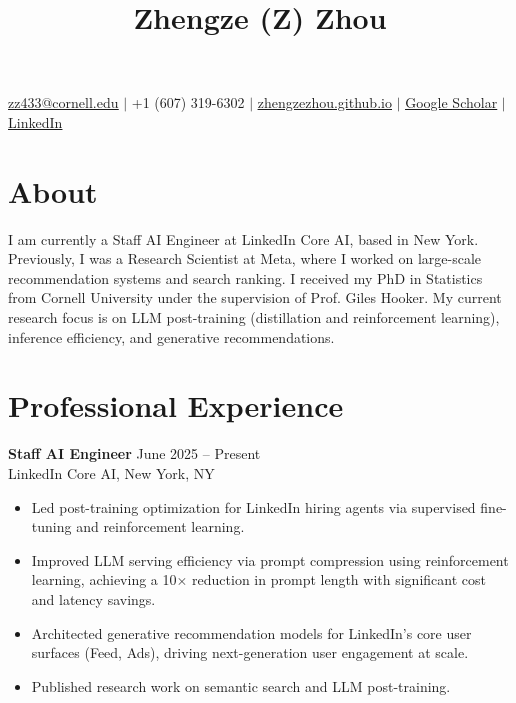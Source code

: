 \documentclass{article}
\title{\textbf{Zhengze (Z) Zhou}\vspace{-3em}}
\author{}
\date{}
\begin{document}
\pagestyle{empty}
\maketitle

\begin{center}
  \small
  \href{mailto:zz433@cornell.edu}{\underline{zz433@cornell.edu}}
  $|$ +1 (607) 319-6302
  $|$ \href{https://zhengzezhou.github.io}{\underline{zhengzezhou.github.io}}
  $|$ \href{https://scholar.google.com/citations?user=MEEbBwMAAAAJ&hl=en}{\underline{Google Scholar}}
  $|$ \href{https://www.linkedin.com/in/z-zhou-42139bb7/}{\underline{LinkedIn}}
\end{center}

\vspace{1mm}

\section*{About}

I am currently a Staff AI Engineer at LinkedIn Core AI, based in New York. Previously, I was
a Research Scientist at Meta, where I worked on large-scale recommendation systems and search ranking.
I received my PhD in Statistics from Cornell University under the supervision of Prof. Giles Hooker.
My current research focus is on LLM post-training (distillation and reinforcement learning),
inference efficiency, and generative recommendations.

\section*{Professional Experience}

\noindent\textbf{Staff AI Engineer} \hfill June 2025 -- Present \\
LinkedIn Core AI, New York, NY

\begin{itemize}
  \item Led post-training optimization for LinkedIn hiring agents via supervised fine-tuning and reinforcement learning.
  \item Improved LLM serving efficiency via prompt compression using reinforcement learning,
        achieving a 10$\times$ reduction in prompt length with significant cost and latency savings.
  \item Architected generative recommendation models for LinkedIn's core user surfaces
        (Feed, Ads), driving next-generation user engagement at scale.
  \item Published research work on semantic search and LLM post-training.
\end{itemize}
\end{document}

